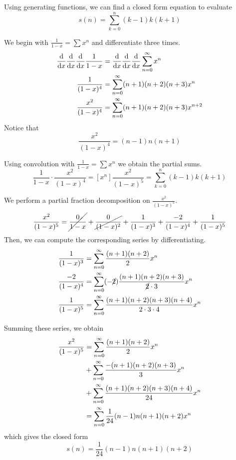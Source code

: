 \documentclass[11pt]{article}
\begin{document}

Using generating functions, we can find a closed form equation to evaluate
%
\begin{equation*}
    s(n) = \sum_{k=0}^n (k-1)k(k+1)
\end{equation*}

We begin with $\frac{1}{1-x} = \sum x^n$ and differentiate three times.
%
\begin{align*}
    \frac{\mathrm{d} }{\mathrm{d} x} \frac{\mathrm{d} }{\mathrm{d} x} \frac{\mathrm{d} }{\mathrm{d} x} \frac{1}{1-x}
    &= \frac{\mathrm{d} }{\mathrm{d} x} \frac{\mathrm{d} }{\mathrm{d} x} \frac{\mathrm{d} }{\mathrm{d} x} \sum^\infty_{n=0} x^n \\
    \frac{1}{(1-x)^4} &= \sum^\infty_{n=0} (n+1)(n+2)(n+3) x^n \\
    \frac{x^2}{(1-x)^4} &= \sum^\infty_{n=0} (n+1)(n+2)(n+3) x^{n+2}
\end{align*}
%
Notice that
%
\begin{equation*}
    [x^n] \frac{x^2}{(1-x)^4} = (n-1)n(n+1)
\end{equation*}

Using convolution with $\frac{1}{1-x} = \sum x^n$ we obtain the partial sums.
%
\begin{equation*}
    [x^n] \frac{1}{1-x} \cdot \frac{x^2}{(1-x)^4}
    = [x^n] \frac{x^2}{(1-x)^5}
    = \sum_{k=0}^n (k-1)k(k+1)
\end{equation*}

We perform a partial fraction decomposition on $\frac{x^2}{(1-x)^5}$.
%
\begin{equation*}
    \frac{x^2}{(1-x)^5}
    = \cancel{\frac{0}{1-x}}
    + \cancel{\frac{0}{(1-x)^2}}
    + \frac{1}{(1-x)^3}
    + \frac{-2}{(1-x)^4}
    + \frac{1}{(1-x)^5}
\end{equation*}
%
Then, we can compute the corresponding series by differentiating.
%
\begin{align*}
    \frac{1}{(1-x)^3}
    &= \sum^\infty_{n=0} \frac{(n+1)(n+2)}{2} x^n \\
    \frac{-2}{(1-x)^4}
    &= \sum^\infty_{n=0}
        (-\cancel{2}) \frac{(n+1)(n+2)(n+3)}{\cancel{2} \cdot 3}
        x^n \\
    \frac{1}{(1-x)^5}
    &= \sum^\infty_{n=0} \frac{(n+1)(n+2)(n+3)(n+4)}{2 \cdot 3 \cdot 4} x^n
\end{align*}

Summing these series, we obtain
%
\begin{align*}
    \frac{x^2}{(1-x)^5}
    &= \sum^\infty_{n=0} \frac{(n+1)(n+2)}{2} x^n \\
    &+ \sum^\infty_{n=0} \frac{-(n+1)(n+2)(n+3)}{3} x^n \\
    &+ \sum^\infty_{n=0} \frac{(n+1)(n+2)(n+3)(n+4)}{24} x^n \\
    &= \sum^\infty_{n=0} \frac{1}{24} (n-1)n(n+1)(n+2) x^n
\end{align*}
%
which gives the closed form
%
\begin{equation*}
    s(n) = \frac{1}{24} (n-1)n(n+1)(n+2)
\end{equation*}
\end{document}
